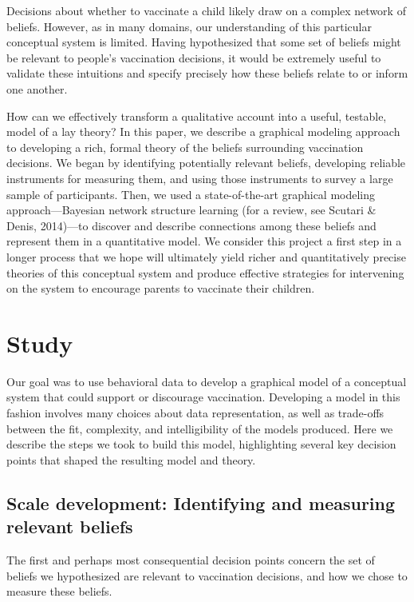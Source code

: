 \documentclass[10pt, letterpaper]{article}
\begin{document}
Decisions about whether to vaccinate a child likely draw on a complex
network of beliefs. However, as in many domains, our understanding of
this particular conceptual system is limited. Having hypothesized that
some set of beliefs might be relevant to people's vaccination decisions,
it would be extremely useful to validate these intuitions and specify
precisely how these beliefs relate to or inform one another.

How can we effectively transform a qualitative account into a useful,
testable, model of a lay theory? In this paper, we describe a graphical
modeling approach to developing a rich, formal theory of the beliefs
surrounding vaccination decisions. We began by identifying potentially
relevant beliefs, developing reliable instruments for measuring them,
and using those instruments to survey a large sample of participants.
Then, we used a state-of-the-art graphical modeling approach---Bayesian
network structure learning (for a review, see Scutari \& Denis,
2014)---to discover and describe connections among these beliefs and
represent them in a quantitative model. We consider this project a first
step in a longer process that we hope will ultimately yield richer and
quantitatively precise theories of this conceptual system and produce
effective strategies for intervening on the system to encourage parents
to vaccinate their children.

\section{Study}\label{study}

Our goal was to use behavioral data to develop a graphical model of a
conceptual system that could support or discourage vaccination.
Developing a model in this fashion involves many choices about data
representation, as well as trade-offs between the fit, complexity, and
intelligibility of the models produced. Here we describe the steps we
took to build this model, highlighting several key decision points that
shaped the resulting model and theory.

\subsection{Scale development: Identifying and measuring relevant
beliefs}\label{scale-development-identifying-and-measuring-relevant-beliefs}

The first and perhaps most consequential decision points concern the set
of beliefs we hypothesized are relevant to vaccination decisions, and
how we chose to measure these beliefs.
\end{document}
